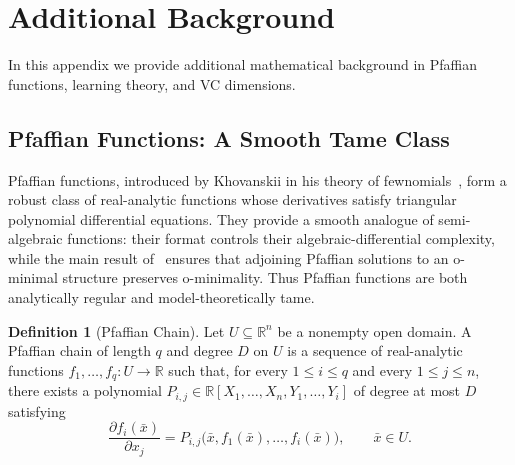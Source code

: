 \documentclass{article}
\theoremstyle{plain}
\theoremstyle{definition}
\theoremstyle{remark}
\newcommand{\reals}{\mathbb{R}}
\theoremstyle{plain}
\numberwithin{thm}{section}
\theoremstyle{definition}
\newtheorem{Def}[thm]{Definition}
\numberwithin{equation}{section}
\begin{document}




%



\appendix


\clearpage

\section{Additional Background}
\label{s:MoreBackground}

In this appendix we provide additional mathematical background in Pfaffian functions, learning theory, and VC dimensions.


\subsection{Pfaffian Functions: A Smooth Tame Class}
\label{s:MoreBackground__ss:MoreLogic}
Pfaffian functions, introduced by Khovanskii in his theory of fewnomials~\citep{Khovanskii_Fewnomials}, form a robust class of real-analytic functions whose derivatives satisfy triangular polynomial differential equations.  They provide a smooth analogue of semi-algebraic functions: their format controls their algebraic-differential complexity, while the main result of~\citep{speissegger1999pfaffian} ensures that adjoining Pfaffian solutions to an o-minimal structure preserves o-minimality.  Thus Pfaffian functions are both analytically regular and model-theoretically tame.

\begin{Def}[Pfaffian Chain]
\label{def:pfaffian_chain}
Let $U\subseteq\reals^n$ be a nonempty open domain.  A Pfaffian chain of length $q$ and degree $D$ on $U$ is a sequence of real-analytic functions
$
    f_1,\dots,f_q:U\to\reals
$
such that, for every $1\le i\le q$ and every $1\le j\le n$, there exists a polynomial
$
    P_{i,j}\in\reals[X_1,\dots,X_n,Y_1,\dots,Y_i]
$
of degree at most $D$ satisfying
$$
    \frac{\partial f_i(\bar{x})}{\partial x_j}
    =
    P_{i,j}\big(\bar{x},f_1(\bar{x}),\dots,f_i(\bar{x})\big),
    \qquad
    \bar{x}\in U .
$$
\end{Def}
\end{document}
